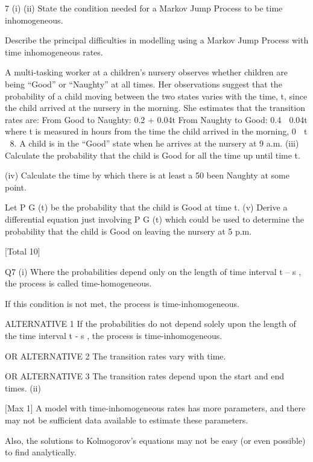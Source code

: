 \documentclass[a4paper,12pt]{article}
\begin{document}

7
(i)
(ii)
State the condition needed for a Markov Jump Process to be time
inhomogeneous.

Describe the principal difficulties in modelling using a Markov Jump Process
with time inhomogeneous rates.

A multi-tasking worker at a children’s nursery observes whether children are being
“Good” or “Naughty” at all times. Her observations suggest that the probability of a
child moving between the two states varies with the time, t, since the child arrived at
the nursery in the morning. She estimates that the transition rates are:
From Good to Naughty: 0.2 + 0.04t
From Naughty to Good: 0.4  0.04t
where t is measured in hours from the time the child arrived in the morning,
0  t  8.
A child is in the “Good” state when he arrives at the nursery at 9 a.m.
(iii) Calculate the probability that the child is Good for all the time up until time t.

(iv) Calculate the time by which there is at least a 50%
been Naughty at some point.

Let P G (t) be the probability that the child is Good at time t.
(v)
Derive a differential equation just involving P G (t) which could be used to
determine the probability that the child is Good on leaving the nursery at
5 p.m.

[Total 10]

Q7
(i)
Where the probabilities depend only on the length of time interval t – s , the
process is called time-homogeneous.

If this condition is not met, the process is time-inhomogeneous.

ALTERNATIVE 1
If the probabilities do not depend solely upon the length of the time interval t -
s , the process is time-inhomogeneous.

OR ALTERNATIVE 2
The transition rates vary with time.

OR ALTERNATIVE 3
The transition rates depend upon the start and end times.
(ii)

[Max 1]
A model with time-inhomogeneous rates has more parameters, and there may
not be sufficient data available to estimate these parameters.

Also, the solutions to Kolmogorov’s equations may not be easy (or even
possible) to find analytically.
\end{document}
